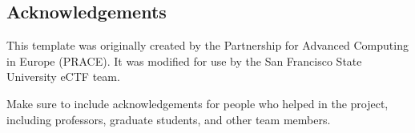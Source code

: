 \documentclass{prace}
\begin{document}
\subsection*{Acknowledgements}
This template was originally created by the Partnership for Advanced Computing
in Europe (PRACE). It was modified for use by the San Francisco State University
eCTF team.

Make sure to include acknowledgements for people who helped in the project,
including professors, graduate students, and other team members.

\end{document}
